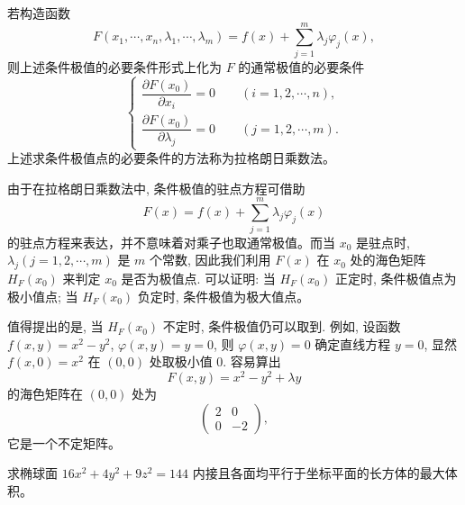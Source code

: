 \documentclass[12pt,fontset=fandol]{ctexart}
\begin{document}
\begin{remark}\quad 若构造函数
\[
  F(x_1,\cdots,x_n,\lambda_1,\cdots,\lambda_m)
  =
  f(x)+\sum_{j=1}^m\lambda_j\varphi_j(x),
\]
则上述条件极值的必要条件形式上化为 $F$ 的通常极值的必要条件
\begin{equation}
  \begin{cases}
    \dfrac{\partial F(x_0)}{\partial x_i}=0
    \qquad (i=1,2,\cdots,n),\\[1.2ex]
    \dfrac{\partial F(x_0)}{\partial\lambda_j}=0
    \qquad (j=1,2,\cdots,m).
  \end{cases}
\label{course-eq-14-5-9}
\end{equation}
上述求条件极值点的必要条件的方法称为拉格朗日乘数法。

由于在拉格朗日乘数法中, 条件极值的驻点方程可借助
\[
  F(x)=f(x)+\sum_{j=1}^m\lambda_j\varphi_j(x)
\]
的驻点方程来表达，并不意味着对乘子也取通常极值。而当 $x_0$ 是驻点时, $\lambda_j(j=1,2,\cdots,m)$ 是 $m$ 个常数, 因此我们利用 $F(x)$ 在 $x_0$ 处的海色矩阵 $H_F(x_0)$ 来判定 $x_0$ 是否为极值点. 可以证明: 当 $H_F(x_0)$ 正定时, 条件极值点为极小值点; 当 $H_F(x_0)$ 负定时, 条件极值为极大值点。

值得提出的是, 当 $H_F(x_0)$ 不定时, 条件极值仍可以取到. 例如, 设函数 $f(x,y)=x^2-y^2$, $\varphi(x,y)=y=0$, 则 $\varphi(x,y)=0$ 确定直线方程 $y=0$, 显然 $f(x,0)=x^2$ 在 $(0,0)$ 处取极小值 $0$. 容易算出
\[
  F(x,y)=x^2-y^2+\lambda y
\]
的海色矩阵在 $(0,0)$ 处为
\[
  \begin{pmatrix}
    2 & 0\\
    0 & -2
  \end{pmatrix},
\]
它是一个不定矩阵。

\end{remark}
\begin{example}\label{course-example-14-5-4}\quad 求椭球面 $16x^2+4y^2+9z^2=144$ 内接且各面均平行于坐标平面的长方体的最大体积。

\end{example}
\end{document}
